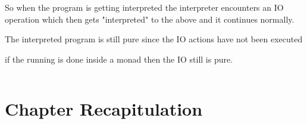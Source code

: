 \documentclass[thesis-solanki.tex]{subfiles}
\begin{document}
So when the program is getting interpreted the interpreter encounters an IO operation which then gets "interpreted" to the above and it 
continues normally.

The interpreted program is still pure since the IO actions have not been executed 

if the running is done inside a monad then the IO still is pure.


\begin{singlespace}
  \inputminted[linenos]{haskell}{haskell-proto4-platen-winkel.hs}
\end{singlespace}


\section{Chapter Recapitulation}

\ifMain
\begin{scope}
  \nolinenumbers
  \enotesize
  \par
  \begin{singlespace}
  \setlength{\parskip}{12pt plus 2pt minus 1pt}
  \theendnotes
  \par
  \end{singlespace}
\end{scope}
\fi
\end{document}
